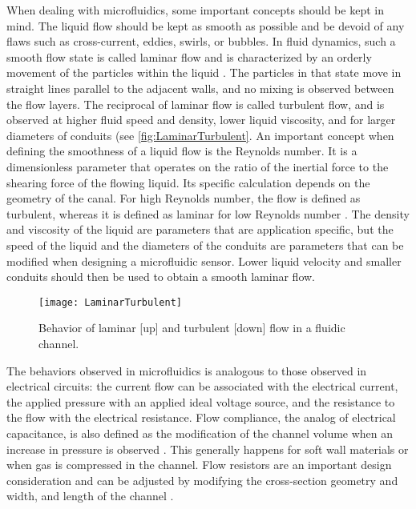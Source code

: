 When dealing with microfluidics, some important concepts should be kept in mind. The liquid flow should be kept as smooth as possible and be devoid of any flaws such as cross-current, eddies, swirls, or bubbles. In fluid dynamics, such a smooth flow state is called laminar flow and is characterized by an orderly movement of the particles within the liquid \cite{lagerstrom1996laminar,bruus2011theoretical}. The particles in that state move in straight lines parallel to the adjacent walls, and no mixing is observed between the flow layers. The reciprocal of laminar flow is called turbulent flow, and is observed at higher fluid speed and density, lower liquid viscosity, and for larger diameters of conduits (see \autoref{fig:LaminarTurbulent}. An important concept when defining the smoothness of a liquid flow is the Reynolds number. It is a dimensionless parameter that operates on the ratio of the inertial force to the shearing force of the flowing liquid. Its specific calculation depends on the geometry of the canal. For high Reynolds number, the flow is defined as turbulent, whereas it is defined as laminar for low Reynolds number \cite{lagerstrom1996laminar,bruus2011theoretical}. The density and viscosity of the liquid are parameters that are application specific, but the speed of the liquid and the diameters of the conduits are parameters that can be modified when designing a microfluidic sensor. Lower liquid velocity and smaller conduits should then be used to obtain a smooth laminar flow. \par
\begin{figure}[h]
    \centering
    \texttt{[image: LaminarTurbulent]}
    \caption{Behavior of laminar [up] and turbulent [down] flow in a fluidic channel. \citep{simscale_2021}}
    \label{fig:LaminarTurbulent}
\end{figure}
The behaviors observed in microfluidics is analogous to those observed in electrical circuits: the current flow can be associated with the electrical current, the applied pressure with an applied ideal voltage source, and the resistance to the flow with the electrical resistance. Flow compliance, the analog of electrical capacitance, is also defined as the modification of the channel volume when an increase in pressure is observed \cite{bruus2011theoretical}. This generally happens for soft wall materials or when gas is compressed in the channel. Flow resistors are an important design consideration and can be adjusted by modifying the cross-section geometry and width, and length of the channel \cite{bruus2011theoretical,Olanrewaju2018}. \par

